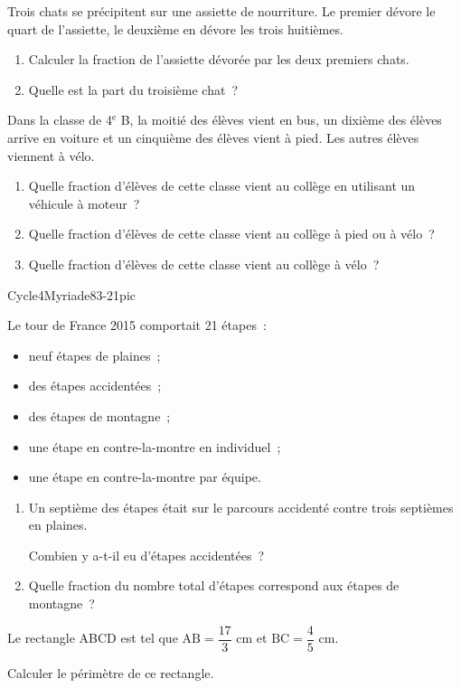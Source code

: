\documentclass{article}
\begin{document}
Trois chats se précipitent sur une assiette de nourriture. Le premier dévore
le quart de l'assiette, le deuxième en dévore les trois huitièmes.
\begin{enumerate}
    \item Calculer la fraction de l'assiette dévorée par les deux premiers
    chats.
    \item Quelle est la part du troisième chat~?
\end{enumerate}
Dans la classe de 4$^{\text{e}}$ B, la moitié des élèves vient en bus, un
dixième des élèves arrive en voiture et un cinquième des élèves vient à pied.
Les autres élèves viennent à vélo.
\begin{enumerate}
    \item Quelle fraction d'élèves de cette classe vient au collège en
    utilisant un véhicule à moteur~?
    \item Quelle fraction d'élèves de cette classe vient au collège à pied
    ou à vélo~?
    \item Quelle fraction d'élèves de cette classe vient au collège à vélo~?
\end{enumerate}
{\centering Cycle4Myriade83-21pic\par}
Le tour de France 2015 comportait 21 étapes~:
\begin{itemize}[label=$-$]
    \item neuf étapes de plaines~;
    \item des étapes accidentées~;
    \item des étapes de montagne~;
    \item une étape en contre-la-montre en individuel~;
    \item une étape en contre-la-montre par équipe.
\end{itemize}
\begin{enumerate}
    \item Un septième des étapes était sur le parcours accidenté contre trois
    septièmes en plaines.\par Combien y a-t-il eu d'étapes accidentées~?
    \item Quelle fraction du nombre total d'étapes correspond aux étapes de
    montagne~?
\end{enumerate}
Le rectangle ABCD est tel que $\text{AB}=\dfrac{17}3$ cm et
$\text{BC}=\dfrac45$ cm.\par\medskip\noindent
Calculer le périmètre de ce rectangle.
\end{document}
